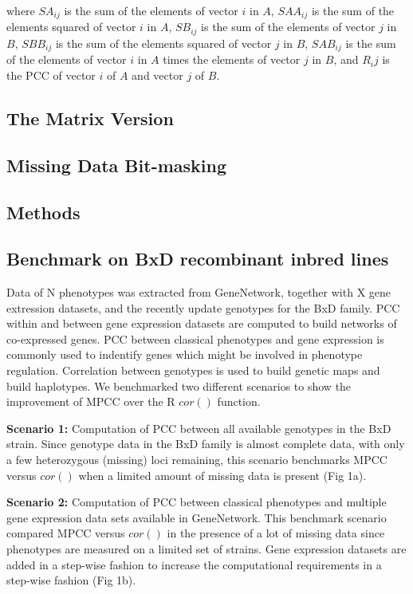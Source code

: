 \documentclass{bioinfo}
\begin{document}
\vspace{2mm}

\noindent where $SA_{ij}$ is the sum of the elements of vector $i$ in $A$, 
$SAA_{ij}$ is the sum of the elements squared of vector $i$ in $A$, 
$SB_{ij}$ is the sum of the elements of vector $j$ in $B$, 
$SBB_{ij}$ is the sum of the elements squared of vector $j$ in $B$, 
$SAB_{ij}$ is the sum of the elements of vector $i$ in $A$ times the  elements of vector $j$ in $B$, 
and $R_ij$ is the PCC of vector $i$ of $A$ and vector $j$ of $B$.

\subsection{The Matrix Version}

\subsection{Missing Data Bit-masking}

\begin{methods}
\section{Methods}

\subsection{Benchmark on BxD recombinant inbred lines}
Data of N phenotypes was extracted from GeneNetwork, together with 
X gene extression datasets, and the recently update genotypes for 
the BxD family. PCC within and between gene expression datasets are 
computed to build networks of co-expressed genes. PCC between 
classical phenotypes and gene expression is commonly used to 
indentify genes which might be involved in phenotype regulation. 
Correlation between genotypes is used to build genetic maps and 
build haplotypes. We benchmarked two different scenarios to show 
the improvement of MPCC over the R $cor()$ function.

{\bf Scenario 1:} Computation of PCC between all available genotypes 
in the BxD strain. Since genotype data in the BxD family is almost 
complete data, with only a few heterozygous (missing) loci remaining, 
this scenario benchmarks MPCC versus $cor()$ when a limited amount of 
missing data is present (Fig 1a).

{\bf Scenario 2:} Computation of PCC between classical phenotypes and 
multiple gene expression data sets available in GeneNetwork. This 
benchmark scenario compared MPCC versus $cor()$ in the presence of 
a lot of missing data since phenotypes are measured on a limited set 
of strains. Gene expression datasets are added in a step-wise fashion 
to increase the computational requirements in a step-wise fashion 
(Fig 1b).

\end{methods}
\end{document}
